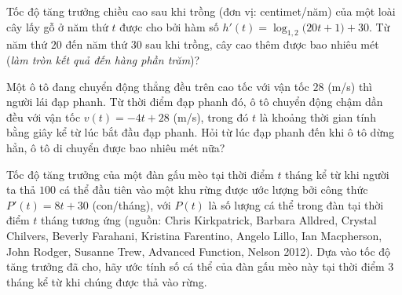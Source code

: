 \begin{bt}%
	Tốc độ tăng trưởng chiều cao sau khi trồng (đơn vị: centimet/năm) của một loài cây lấy gỗ ở năm thứ $t$ được  cho bởi hàm số $h'(t)=\log_{1{,}2}\big(20t+1\big)+30$.
	Từ năm thứ $20$ đến năm thứ $30$ sau khi trồng, cây cao thêm được bao nhiêu mét (\textit{làm  tròn kết quả đến hàng phần trăm})?
\end{bt}

\begin{bt}%
	Một ô tô đang chuyển động thẳng đều trên cao tốc với vận tốc $28$ (m/s) thì người lái đạp phanh. Từ thời điểm đạp phanh đó, ô tô chuyển động chậm dần đều với vận tốc $v(t)=-4t+28$ (m/s), trong đó $t$  là khoảng thời gian tính bằng giây kể từ lúc bắt đầu đạp phanh. Hỏi từ lúc đạp phanh đến khi ô tô dừng hẳn, ô tô di chuyển được bao nhiêu mét nữa?
\end{bt}

\begin{bt}%
	Tốc độ tăng trưởng của một đàn gấu mèo tại thời điểm $t$ tháng kể từ khi người ta  thả $100$ cá thể đầu tiên vào một khu rừng được ước lượng bởi công thức $P'(t)=8t+30$ (con/tháng), với $P(t)$ là số lượng cá thể trong đàn tại thời điểm $t$ tháng tương ứng (nguồn: Chris Kirkpatrick, Barbara Alldred, Crystal Chilvers, Beverly Farahani, Kristina Farentino, Angelo Lillo, Ian Macpherson, John Rodger, Susanne Trew, Advanced Function, Nelson 2012). Dựa vào tốc độ tăng trưởng đã cho, hãy ước tính số cá thể của đàn gấu mèo này tại thời điểm $3$ tháng kể từ khi chúng được thả vào rừng.
\end{bt}

